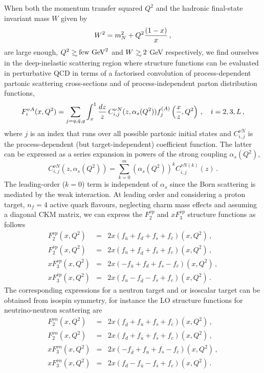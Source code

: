 \documentclass[11pt,a4paper]{article}
\newcommand{\be}{\begin{equation}}
\newcommand{\ee}{\end{equation}}
\newcommand{\bea}{\begin{eqnarray}}
\newcommand{\eea}{\end{eqnarray}}
\newcommand{\lp}{\left(}
\newcommand{\rp}{\right)}
\def\frac#1#2{{{#1}\over {#2}}}
\def\gsim{\mathrel{\rlap{\lower4pt\hbox{\hskip1pt$\sim$}}
    \raise1pt\hbox{$>$}}}
\numberwithin{equation}{section}
\numberwithin{figure}{section}
\numberwithin{table}{section}
\begin{document}
When both the momentum transfer squared $Q^2$
and the  hadronic final-state
invariant mass $W$ given by
\be
W^2 = m_N^2 + Q^2 \frac{(1-x)}{x} \, ,
\ee
are large enough, $Q^2 \gsim {\rm few~GeV}^2$ and $W \gsim 2$ GeV
respectively, we find ourselves in the
deep-inelastic scattering region where
structure functions can be evaluated in perturbative QCD in terms of a factorised
convolution of process-dependent partonic scattering cross-sections and
of process-independent parton distribution functions,
\be
\label{eq:sfs_pqcd}
 F^{\nu A}_i(x,Q^2) = \sum_{j=q,\bar{q},g}\int_x^1 \frac{dz}{z}\, C_{i,j}^{\nu N}(z,\alpha_s(Q^2))f^{(A)}_j\lp \frac{x}{z},Q^2\rp \, , \quad i = 2,3,L \, ,
 \ee
 where $j$ is an index that runs over all possible partonic initial states
 and $C_{i,j}^{\nu N}$ is the process-dependent (but target-independent) coefficient function.
 The latter can be expressed  as a series expansion in powers of the strong
 coupling $\alpha_s(Q^2)$,
 \be
 \label{eq:coeff_fun_expansion}
 C_{i,j}^{\nu N}(z,\alpha_s(Q^2)) = \sum_{k=0}^m \lp \alpha_s(Q^2) \rp^{k} C_{i,j}^{\nu N(k)}(z) \, .
 \ee
 The leading-order ($k=0$)  term is independent of $\alpha_s$ since the Born scattering
 is mediated by the weak interaction.
 At leading order and considering a proton target, $n_f=4$ active quark flavours,
 neglecting charm mass effects and assuming a diagonal CKM matrix,
 we can express the $F_2^{\nu p}$ and $xF_3^{\nu p}$ structure functions as
 follows
 \bea
 F_2^{\nu p}(x,Q^2) &=& 2x\lp f_{\bar{u}} + f_{d} + f_{s} + f_{\bar{c}} \rp(x,Q^2) \, , \nonumber  \\
 F_2^{\bar{\nu} p}(x,Q^2) &=& 2x\lp f_u + f_{\bar{d}} + f_{\bar{s}} + f_c \rp(x,Q^2) \, , \label{eq:neutrinoSFs} \\
 xF_3^{\nu p}(x,Q^2) &=& 2x\lp -f_{\bar{u}} + f_d +f_s - f_{\bar{c}}\rp(x,Q^2)  \, , \nonumber\\
 xF_3^{\bar{\nu} p}(x,Q^2) &=& 2x\lp f_u - f_{\bar{d}} -f_{\bar{s}} + f_{c}\rp(x,Q^2) \, . \nonumber
 \eea
 The corresponding expressions for a neutron target and or isoscalar target can be obtained
 from isospin symmetry, for instance the LO structure functions for
 neutrino-neutron scattering are
 \bea
 F_2^{\nu n}(x,Q^2) &=& 2x\lp f_{\bar{d}} + f_{u} + f_{s} + f_{\bar{c}} \rp(x,Q^2) \, , \nonumber  \\
 F_2^{\bar{\nu} n}(x,Q^2) &=& 2x\lp f_d + f_{\bar{u}} + f_{\bar{s}} + f_c \rp(x,Q^2) \, , \label{eq:antineutrinoSFs} \\
 xF_3^{\nu n}(x,Q^2) &=& 2x\lp -f_{\bar{d}} + f_u +f_s - f_{\bar{c}}\rp(x,Q^2)  \, , \nonumber\\
 xF_3^{\bar{\nu} n}(x,Q^2) &=& 2x\lp f_d - f_{\bar{u}} -f_{\bar{s}} + f_{c}\rp(x,Q^2) \, . \nonumber
 \eea
 
\end{document}

